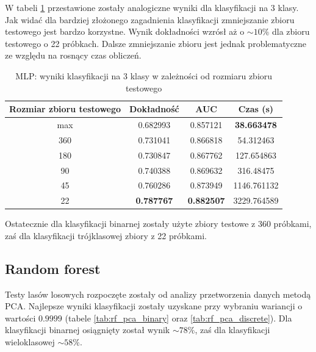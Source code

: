 \documentclass[a4paper, twoside, 11pt, openright]{article}
\begin{document}
W tabeli \ref{tab:nn_walk_forward_test_discrete} przestawione zostały analogiczne wyniki dla klasyfikacji na 3 klasy. Jak widać dla bardziej złożonego zagadnienia klasyfikacji zmniejszanie zbioru testowego jest bardzo korzystne. Wynik dokładności wzrósł aż o $\sim 10\%$ dla zbioru testowego o 22 próbkach. Dalsze zmniejszanie zbioru jest jednak problematyczne ze względu na rosnący czas obliczeń.

\begin{table}[H]
    \centering
    \begin{tabular}{|c|c|c|c|}
    \hline
        \textbf{Rozmiar zbioru testowego} & \textbf{Dokładność} &  \textbf{AUC} &  \textbf{Czas (s)} \\ \hline
max    &  0.682993 &  0.857121 &  \textbf{38.663478} \\ \hline
360     &  0.731041 &  0.866818 &  54.312463 \\ \hline
180   &  0.730847 &  0.867762 &  127.654863 \\ \hline
90   &  0.740388 &  0.869632 &  316.48475 \\ \hline
45     &  0.760286 &  0.873949 &  1146.761132 \\ \hline
22  &  \textbf{0.787767} &  \textbf{0.882507} &  3229.764589 \\ \hline
    \end{tabular}
    \caption{MLP: wyniki klasyfikacji na 3 klasy w zależności od rozmiaru zbioru testowego}
    \label{tab:nn_walk_forward_test_discrete}
\end{table}

Ostatecznie dla klasyfikacji binarnej zostały użyte zbiory testowe z 360 próbkami, zaś dla klasyfikacji trójklasowej zbiory z 22 próbkami.



\subsection{Random forest}

Testy lasów losowych rozpoczęte zostały od analizy przetworzenia danych metodą PCA. Najlepsze wyniki klasyfikacji zostały uzyskane przy wybraniu wariancji o wartości $0.9999$ (tabele \ref{tab:rf_pca_binary} oraz \ref{tab:rf_pca_discrete}). Dla klasyfikacji binarnej osiągnięty został wynik $\sim 78\%$, zaś dla klasyfikacji wieloklasowej  $\sim 58\%$.
\end{document}
